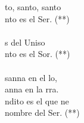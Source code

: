 \begin{cancion}[Santo][Peruano]%
	to, santo, santo\\
	nto es el Ser. (**)\\
	\jump\\
	s del Uniso\\
	nto es el Sor. (**)\\
	\jump\\
	sanna en el lo,\\
	anna en la rra.\\
	ndito es el que ne\\
	nombre del Ser. (**)\\
\end{cancion}%
